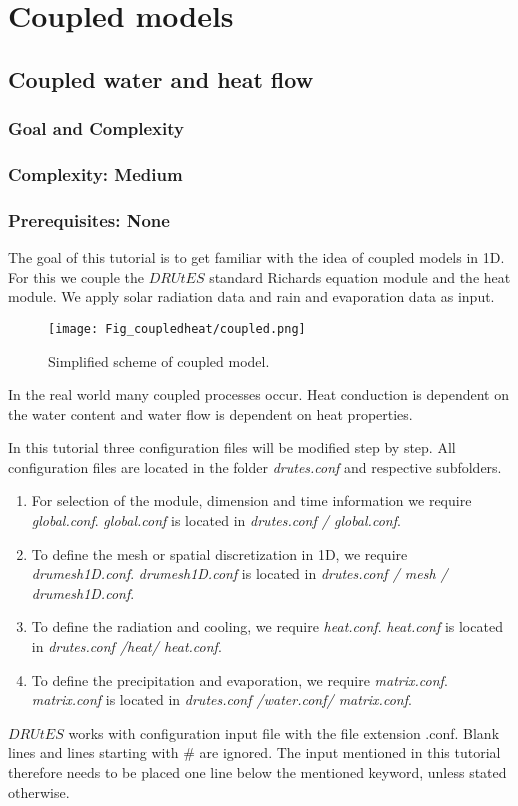\chapter{Coupled models}
\section{Coupled water and heat flow}
\subsection{Goal and Complexity}
\subsection*{Complexity: Medium}

\subsection*{Prerequisites: None}

The goal of this tutorial is to get familiar with the idea of coupled models in 1D. For this we couple the $DRUtES$ standard Richards equation module and the heat module. We apply solar radiation data and rain and evaporation data as input.

\begin{figure}[!h]
\centering
\texttt{[image: Fig\_coupledheat/coupled.png]}
\caption{Simplified scheme of coupled model.}
\end{figure}

In the real world many coupled processes occur. Heat conduction is dependent on the water content and water flow is dependent on heat properties. 

In this tutorial three configuration files will be modified step by step. All configuration files are located in the folder \emph{drutes.conf} and respective subfolders. \begin{enumerate}
\item For selection of the module, dimension and time information we require \emph{global.conf}.  \emph{global.conf} is located in \emph{drutes.conf / global.conf}. 
\item To define the mesh or spatial discretization in 1D,  we require \emph{drumesh1D.conf}. \emph{drumesh1D.conf} is located in \emph{drutes.conf / mesh / drumesh1D.conf}. 
\item To define the radiation and cooling, we require \emph{heat.conf}. \emph{heat.conf} is located in \emph{drutes.conf /heat/ heat.conf}. 
\item To define the precipitation and evaporation, we require \emph{matrix.conf}. \emph{matrix.conf} is located in \emph{drutes.conf /water.conf/ matrix.conf}. 
\end{enumerate}
$DRUtES$ works with configuration input file with the file extension .conf. Blank lines and lines starting with \# are ignored. The input mentioned in this tutorial therefore needs to be placed one line below the mentioned keyword, unless stated otherwise. 

